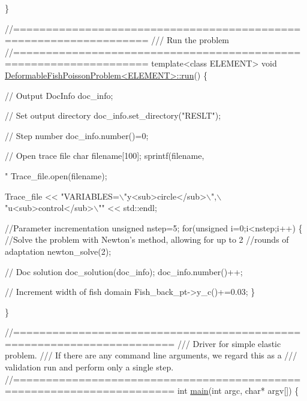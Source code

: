 \begin{DoxyCodeInclude}
{\}
 

\textcolor{comment}{//==================================================================}\textcolor{comment}{}
\textcolor{comment}{/// Run the problem}
\textcolor{comment}{}\textcolor{comment}{//==================================================================}
\textcolor{keyword}{template}<\textcolor{keyword}{class} ELEMENT>
\textcolor{keywordtype}{void} \hyperlink{classDeformableFishPoissonProblem_a0ef0e4ab464ab41a6f0b7e8a74a9c8a5}{DeformableFishPoissonProblem<ELEMENT>::run}()
\{

 \textcolor{comment}{// Output}
 DocInfo doc\_info;

 \textcolor{comment}{// Set output directory}
 doc\_info.set\_directory(\textcolor{stringliteral}{"RESLT"});

 \textcolor{comment}{// Step number}
 doc\_info.number()=0;
 
 \textcolor{comment}{// Open trace file}
 \textcolor{keywordtype}{char} filename[100];
 sprintf(filename,\textcolor{stringliteral}{"%
 Trace\_file.open(filename);

 Trace\_file << \textcolor{stringliteral}{"VARIABLES=\(\backslash\)"y<sub>circle</sub>\(\backslash\)",\(\backslash\)"u<sub>control</sub>\(\backslash\)""}
            << std::endl;

  \textcolor{comment}{//Parameter incrementation}
 \textcolor{keywordtype}{unsigned} nstep=5; 
 \textcolor{keywordflow}{for}(\textcolor{keywordtype}{unsigned} i=0;i<nstep;i++)
  \{
   \textcolor{comment}{//Solve the problem with Newton's method, allowing for up to 2}
   \textcolor{comment}{//rounds of adaptation}
   newton\_solve(2);

   \textcolor{comment}{// Doc solution}
   doc\_solution(doc\_info);
   doc\_info.number()++;

   \textcolor{comment}{// Increment width of fish domain}
   Fish\_back\_pt->y\_c()+=0.03;
  \}

\}

\textcolor{comment}{//======================================================================}\textcolor{comment}{}
\textcolor{comment}{/// Driver for simple elastic problem.}
\textcolor{comment}{/// If there are any command line arguments, we regard this as a }
\textcolor{comment}{/// validation run and perform only a single step.}
\textcolor{comment}{}\textcolor{comment}{//======================================================================}
\textcolor{keywordtype}{int} \hyperlink{algebraic__free__boundary__poisson_8cc_a0ddf1224851353fc92bfbff6f499fa97}{main}(\textcolor{keywordtype}{int} argc, \textcolor{keywordtype}{char}* argv[])
\{

}}
\end{DoxyCodeInclude}
